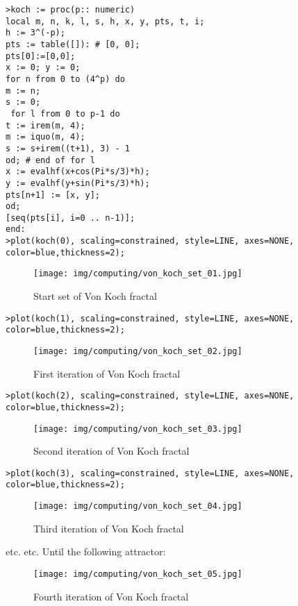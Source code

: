 	\texttt{>koch := proc(p:: numeric)}\\
	\texttt{local m, n, k, l, s, h, x, y, pts, t, i;}\\
     \texttt{h := 3\string^(-p);}\\
     \texttt{pts := table([]): \# [0, 0];}\\
     \texttt{pts[0]:=[0,0];}\\
     \texttt{x := 0; y := 0;}\\
     \texttt{for n from 0 to (4\string^p) do}\\
        \texttt{m := n;}\\
        \texttt{s := 0;}\\
       \texttt{ for l from 0 to p-1 do}\\
           \texttt{t := irem(m, 4);}\\
           \texttt{m := iquo(m, 4);}\\
           \texttt{s := s+irem((t+1), 3) - 1}\\
        \texttt{od;  \# end of for l}\\
        \texttt{x := evalhf(x+cos(Pi*s/3)*h);}\\
        \texttt{y := evalhf(y+sin(Pi*s/3)*h);}\\
        \texttt{pts[n+1] := [x, y];}\\
     \texttt{od;}\\
    \texttt{[seq(pts[i], i=0 .. n-1)];}\\
  \texttt{end:}\\

	\texttt{>plot(koch(0), scaling=constrained, style=LINE, axes=NONE, color=blue,thickness=2);}
	\begin{figure}[H]
		\centering
		\texttt{[image: img/computing/von\_koch\_set\_01.jpg]}
		\caption[]{Start set of Von Koch fractal}
	\end{figure}
	\texttt{>plot(koch(1), scaling=constrained, style=LINE, axes=NONE, color=blue,thickness=2);}
	\begin{figure}[H]
		\centering
		\texttt{[image: img/computing/von\_koch\_set\_02.jpg]}
		\caption[]{First iteration of Von Koch fractal}
	\end{figure}
	\texttt{>plot(koch(2), scaling=constrained, style=LINE, axes=NONE, color=blue,thickness=2);}
	\begin{figure}[H]
		\centering
		\texttt{[image: img/computing/von\_koch\_set\_03.jpg]}
		\caption[]{Second iteration of Von Koch fractal}
	\end{figure}
	\texttt{>plot(koch(3), scaling=constrained, style=LINE, axes=NONE, color=blue,thickness=2);}
	\begin{figure}[H]
		\centering
		\texttt{[image: img/computing/von\_koch\_set\_04.jpg]}
		\caption[]{Third iteration of Von Koch fractal}
	\end{figure}
	etc. etc. Until the following attractor:
	\begin{figure}[H]
		\centering
		\texttt{[image: img/computing/von\_koch\_set\_05.jpg]}
		\caption[]{Fourth iteration of Von Koch fractal}
	\end{figure}
	

